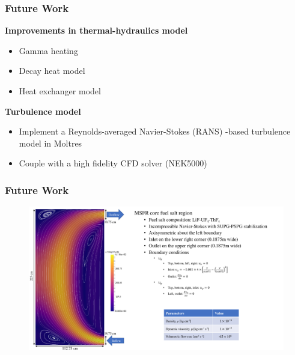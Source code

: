 \begin{frame}
	\frametitle{Future Work}
		\textbf{Improvements in thermal-hydraulics model}
		\begin{itemize}
			\item Gamma heating
			\item Decay heat model
			\item Heat exchanger model
		\end{itemize}
		
		\vspace{.3cm}
		\textbf{Turbulence model}
		\begin{itemize}
			\item Implement a Reynolds-averaged Navier-Stokes (RANS) -based
			turbulence model in Moltres
			\item Couple with a high fidelity CFD solver (NEK5000)
		\end{itemize}
\end{frame}

\begin{frame}
	\frametitle{Future Work}
		\begin{figure}
			\centering
			\includegraphics[width=\textwidth]{./images/flow}
		\end{figure}
\end{frame}
